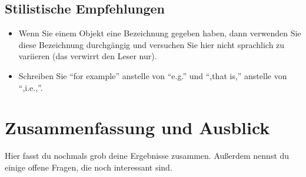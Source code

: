 \documentclass[12pt,a4paper]{article}
\begin{document}
\subsection{Stilistische Empfehlungen}
\begin{itemize}
\item Wenn Sie einem Objekt eine Bezeichnung gegeben haben, dann verwenden Sie diese Bezeichnung durchgängig und versuchen Sie hier nicht sprachlich zu variieren (das verwirrt den Leser nur).
\item Schreiben Sie "`for example"' anstelle von "`e.g."' und "`,that is,"' anstelle von "`,i.e.,"'.
  
\end{itemize}



\section{Zusammenfassung und Ausblick} 
Hier fasst du nochmals grob deine Ergebnisse zusammen.
Außerdem nennst du einige offene Fragen, die noch interessant sind.
\end{document}
